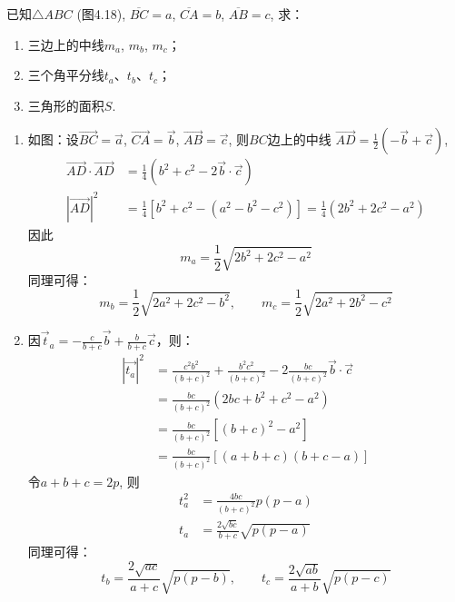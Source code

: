 \begin{example}
    已知$\triangle ABC$ (图4.18), 
$\overline{BC}=a$, $\overline{CA}=b$, $\overline{AB}=c$,
求：
\begin{enumerate}
    \item 三边上的中线$m_a$, $m_b$, $m_c$；
    \item 三个角平分线$t_a$、$t_b$、$t_c$；
\item 三角形的面积$S$.
\end{enumerate}
\end{example}

\begin{solution}
\begin{enumerate}
    \item 如图：设$\Vec{BC}=\vec{a}$, $\Vec{CA}=\vec{b}$, $\Vec{AB}=\vec{c}$, 则$BC$边上的中线
$\Vec{AD}=\frac{1}{2}(-\vec{b}+\vec{c})$,
\[\begin{split}
    \Vec{AD}\cdot \Vec{AD}&=\frac{1}{4}(b^2+c^2-2\vec{b}\cdot \vec{c})\\
    |\Vec{AD}|^2&=\frac{1}{4}[b^2+c^2-(a^2-b^2-c^2)]=\frac{1}{4}(2b^2+2c^2-a^2)
\end{split}\]
因此
\[m_a=\frac{1}{2}\sqrt{2b^2+2c^2-a^2}\]
同理可得：
\[
    m_b=\frac{1}{2}\sqrt{2a^2+2c^2-b^2},\qquad
    m_c=\frac{1}{2}\sqrt{2a^2+2b^2-c^2}
\]

\item 因$\vec{t}_a=-\frac{c}{b+c}\vec{b}+\frac{b}{b+c}\vec{c}$，则：
\[\begin{split}
\left|\vec{t_{a}}\right|^{2} &=\frac{c^{2} b^{2}}{(b+c)^{2}}+\frac{b^{2} c^{2}}{(b+c)^{2}}-2 \frac{b c}{(b+c)^{2}} \vec{b} \cdot \vec{c} \\
&=\frac{b c}{(b+c)^{2}}\left(2 b c+b^{2}+c^{2}-a^{2}\right) \\
&=\frac{b c}{(b+c)^{2}}\left[(b+c)^{2}-a^{2}\right] \\
&=\frac{b c}{(b+c)^{2}}[(a+b+c)(b+c-a)]
\end{split}\]  
令$a+b+c=2p$, 则
\[\begin{split}
    t^2_a&=\frac{4bc}{(b+c)^2}p(p-a)\\
t_a&=\frac{2\sqrt{bc}}{b+c}\sqrt{p(p-a)}
\end{split}\]
同理可得：
\[
    t_b=\frac{2\sqrt{ac}}{a+c}\sqrt{p(p-b)},\qquad
    t_c=\frac{2\sqrt{ab}}{a+b}\sqrt{p(p-c)}
\]


\end{enumerate}
\end{solution}
